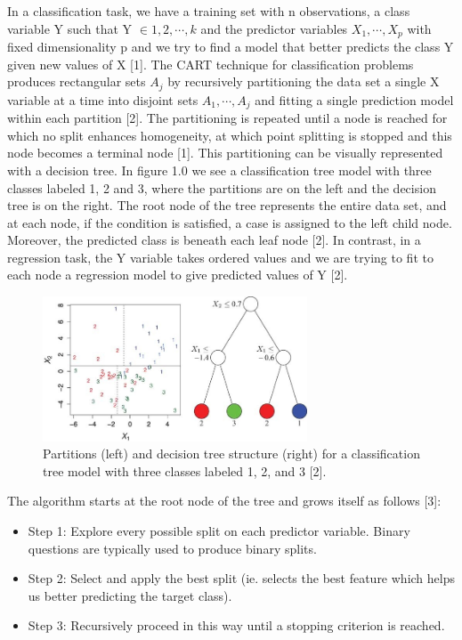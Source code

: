 \documentclass{usiinftr}
\begin{document}
In a classification task, we have a training set with n observations, a class variable Y such that Y $\in {1, 2, \cdots, k}$ and the predictor variables $X_1, \cdots ,X_p$ with fixed dimensionality p and we try to find a model that better predicts the class Y given new values of X [1]. The CART technique for classification problems produces rectangular sets $A_j$ by recursively partitioning the data set a single X variable at a time into disjoint sets $A_1,\cdots, A_j$ and fitting a single prediction model within each partition [2]. The partitioning is repeated until a node is reached for which no split enhances homogeneity, at which point splitting is stopped and this node becomes a terminal node [1]. This partitioning can be visually represented with a decision tree. In figure 1.0 we see a classification tree model with three classes labeled 1, 2 and 3, where the partitions are on the left and the decision tree is on the right. The root node of the tree represents the entire data set, and at each node, if the condition is satisfied, a case is assigned to the left child node. Moreover, the predicted class is beneath each leaf node [2]. In contrast, in a regression task, the Y variable takes ordered values and we are trying to fit to each node a regression model to give predicted values of Y [2].

\begin{figure}[h!] 
\centering
\includegraphics[width=0.7\textwidth]{images/image114.png}
\caption{Partitions (left) and decision tree structure (right) for a classification tree model with three classes labeled 1, 2, and 3 [2].}
\label{VarImp}
\end{figure}

The algorithm starts at the root node of the tree and grows itself as follows [3]: 
\begin{itemize}
\item Step 1: Explore every possible split on each predictor variable. Binary questions are typically used to produce binary splits.
\item Step 2: Select and apply the best split (ie. selects the best feature which helps us better predicting the target class).
\item Step 3: Recursively proceed in this way until a stopping criterion is reached. 
\end{itemize}
\end{document}
